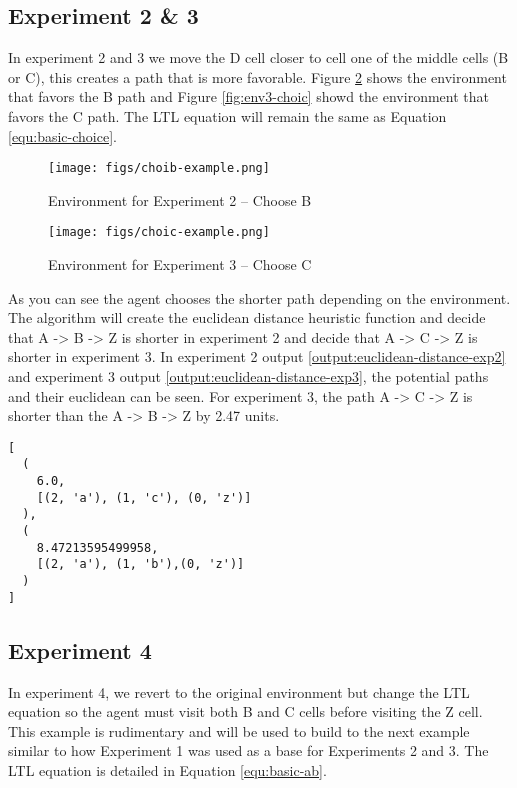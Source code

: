 \documentclass[letter paper, 10 pt, conference]{ieeeconf}
\begin{document}
\subsection{Experiment 2 \& 3}
In experiment 2 and 3 we move the D cell closer to cell one of the middle cells (B or C), this creates a path that is more favorable. Figure \ref{fig:env2-choib} shows the environment that favors the B path and Figure \ref{fig:env3-choic} showd the environment that favors the C path. The LTL equation will remain the same as Equation \ref{equ:basic-choice}.

\begin{figure}[htb]
  \centering
  \texttt{[image: figs/choib-example.png]}
  \caption{Environment for Experiment 2 -- Choose B}
  \label{fig:env2-choib}
\end{figure}

\begin{figure}[htb]
  \centering
  \texttt{[image: figs/choic-example.png]}
  \caption{Environment for Experiment 3 -- Choose C}
  \label{fig:env2-choib}
\end{figure}

As you can see the agent chooses the shorter path depending on the environment. The algorithm will create the euclidean distance heuristic function and decide that A -> B -> Z is shorter in experiment 2 and decide that A -> C -> Z is shorter in experiment 3. In experiment 2 output \ref{output:euclidean-distance-exp2} and experiment 3 output \ref{output:euclidean-distance-exp3}, the potential paths and their euclidean can be seen. For experiment 3, the path A -> C -> Z is shorter than the A -> B -> Z by 2.47 units.

\begin{verbatim}
[
  (
    6.0,
    [(2, 'a'), (1, 'c'), (0, 'z')]
  ),
  (
    8.47213595499958,
    [(2, 'a'), (1, 'b'),(0, 'z')]
  )
]
\end{verbatim}

\subsection{Experiment 4}
In experiment 4, we revert to the original environment but change the LTL equation so the agent must visit both B and C cells before visiting the Z cell. This example is rudimentary and will be used to build to the next example similar to how Experiment 1 was used as a base for Experiments 2 and 3. The LTL equation is detailed in Equation \ref{equ:basic-ab}.
\end{document}
